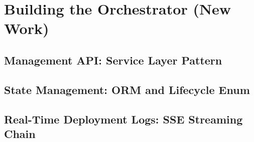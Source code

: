 \section{Building the Orchestrator (New Work)}

\subsection{Management API: Service Layer Pattern}
%
%
%

\subsection{State Management: ORM and Lifecycle Enum}
%
%
%
%

\subsection{Real-Time Deployment Logs: SSE Streaming Chain}
%
%
%
%

